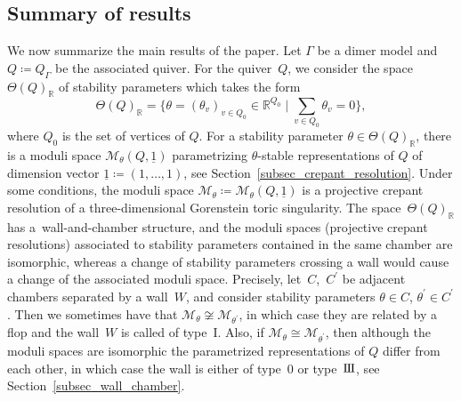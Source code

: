 \documentclass[pdftex]{sigma}
\numberwithin{equation}{section}
\theoremstyle{definition}
\newcommand{\RR}{\mathbb{R}}
\newcommand{\calM}{\mathcal{M}}
\newcommand{\barone}{\underline{1}}
\newcommand{\typeIII}{{\rm I\hspace{-0.7pt}I\hspace{-0.7pt}I}}
\begin{document}
\subsection{Summary of results}
We now summarize the main results of the paper.
Let $\Gamma$ be a dimer model and $Q\coloneqq Q_\Gamma$ be the associated quiver.
For the quiver~$Q$, we consider the space $\Theta(Q)_\RR$ of stability parameters which takes the form
\[
\Theta(Q)_\RR=\biggl\{\theta=(\theta_v)_{v\in Q_0}\in\RR^{Q_0} \mid \sum_{v\in Q_0}\theta_v=0\biggr\},
\]
where $Q_0$ is the set of vertices of $Q$.
For a stability parameter $\theta\in\Theta(Q)_\RR$, there is a moduli space $\calM_\theta(Q,\barone)$ parametrizing $\theta$-stable representations of $Q$ of dimension vector $\barone\coloneqq(1,\dots,1)$, see Section~\ref{subsec_crepant_resolution}.
Under some conditions, the moduli space $\calM_\theta\coloneqq\calM_\theta(Q,\barone)$ is
a projective crepant resolution of a three-dimensional Gorenstein toric singularity.
The space~$\Theta(Q)_\RR$ has a~wall-and-chamber structure, and
the moduli spaces (projective crepant resolutions) associated to stability parameters contained in the same chamber are isomorphic,
whereas a change of stability parameters crossing a wall would cause a change of the associated moduli space.
Precisely, let~$C$,~$C^\prime$ be adjacent chambers separated by a wall~$W$, and consider stability parameters $\theta\in C$, $\theta^\prime\in C^\prime$.
Then we sometimes have that $\calM_\theta\not\cong\calM_{\theta^\prime}$, in which case they are related by a flop and the wall~$W$ is called of type~I.
Also, if $\calM_\theta\cong\calM_{\theta^\prime}$, then although the moduli spaces are isomorphic the parametrized representations of $Q$ differ from each other, in which case the wall is either of type~0 or type~$\typeIII$, see Section~\ref{subsec_wall_chamber}.
\end{document}

